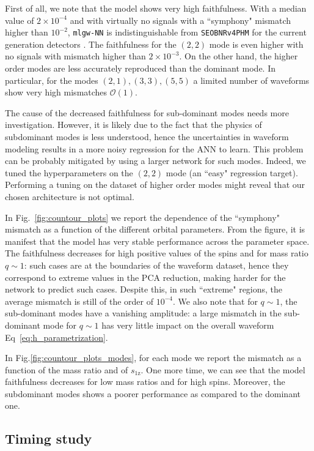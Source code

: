 \documentclass[twocolumn,showpacs,preprintnumbers,nofootinbib,prd,
superscriptaddress,10pt]{revtex4-1}
\begin{document}
{First of all, we note that the model shows very high faithfulness. With a median value of $2\times 10^{-4}$ and with virtually no signals with a ``symphony" mismatch higher than $10^{-2}$, \texttt{mlgw-NN} is indistinguishable from \texttt{SEOBNRv4PHM} for the current generation detectors \cite{WF_systematics}.
The faithfulness for the $(2,2)$ mode is even higher with no signals with mismatch higher than $2\times 10^{-3}$.
On the other hand, the higher order modes are less accurately reproduced than the dominant mode. In particular, for the modes $(2,1), (3,3), (5,5)$ a limited number of waveforms show very high mismatches $\mathcal{O}(1)$.

The cause of the decreased faithfulness for sub-dominant modes needs more investigation. However, it is likely due to the fact that the physics of subdominant modes is less understood, hence the uncertainties in waveform modeling results in a more noisy regression for the ANN to learn.
This problem can be probably mitigated by using a larger network for such modes. Indeed, we tuned the hyperparameters on the $(2,2)$ mode (an ``easy" regression target). Performing a tuning on the dataset of higher order modes might reveal that our chosen architecture is not optimal.

In Fig.~\ref{fig:countour_plots} we report the dependence of the ``symphony" mismatch as a function of the different orbital parameters.
From the figure, it is manifest that the model has very stable performance across the parameter space.
The faithfulness decreases for high positive values of the spins and for mass ratio $q\sim 1$: such cases are at the boundaries of the waveform dataset, hence they correspond to extreme values in the PCA reduction, making harder for the network to predict such cases. Despite this, in such ``extreme" regions, the average mismatch is still of the order of $10^{-4}$.
We also note that for $q\sim 1$, the sub-dominant modes have a vanishing amplitude: a large mismatch in the sub-dominant mode for $q\sim 1$ has very little impact on the overall waveform Eq~\eqref{eq:h_parametrization}. 

In Fig.\ref{fig:countour_plots_modes}, for each mode we report the mismatch as a function of the mass ratio and of $s_\text{1z}$. One more time, we can see that the model faithfulness decreases for low mass ratios and for high spins. Moreover, the subdominant modes shows a poorer performance as compared to the dominant one.

\subsection{Timing study}
\label{sec:timing}

}
\end{document}
